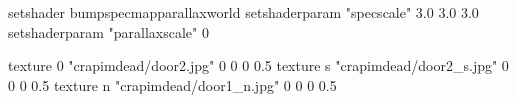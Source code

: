 setshader bumpspecmapparallaxworld
setshaderparam "specscale" 3.0 3.0 3.0
setshaderparam "parallaxscale" 0

texture 0 "crapimdead/door2.jpg" 0 0 0 0.5
texture s "crapimdead/door2_s.jpg" 0 0 0 0.5
texture n "crapimdead/door1_n.jpg" 0 0 0 0.5
